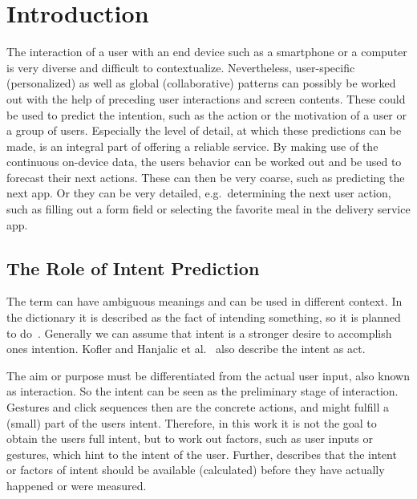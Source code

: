 \chapter{Introduction}
\label{sec:introduction}

The interaction of a user with an end device such as a smartphone or a computer is very diverse and difficult to contextualize.
Nevertheless, user-specific (personalized) as well as global (collaborative) patterns can possibly be worked out with the help of preceding user interactions and screen contents.
These could be used to predict the intention, such as the action or the motivation of a user or a group of users.
Especially the level of detail, at which these predictions can be made, is an integral part of offering a reliable service.
By making use of the continuous on-device data, the users behavior can be worked out and be used to forecast their next actions.
These can then be very coarse, such as predicting the next app.
Or they can be very detailed, e.g.\ determining the next user action, such as filling out a form field or selecting the favorite meal in the delivery service app.

\section{The Role of Intent Prediction}
\label{sec:role-intent-prediction}

The term  can have ambiguous meanings and can be used in different context.
In the dictionary it is described as the fact of intending something, so it is planned to do~\cite{dictionaryIntent}.
Generally we can assume that intent is a stronger desire to accomplish ones intention.
Kofler and Hanjalic et al.~\cite{kofler2016user} also describe the intent as  act.

The aim or purpose must be differentiated from the actual user input, also known as interaction.
So the intent can be seen as the preliminary stage of interaction.
Gestures and click sequences then are the concrete actions, and might fulfill a (small) part of the users intent.
Therefore, in this work it is not the goal to obtain the users full intent, but to work out factors, such as user inputs or gestures, which hint to the intent of the user.
Further,  describes that the intent or factors of intent should be available (calculated) before they have actually happened or were measured.


